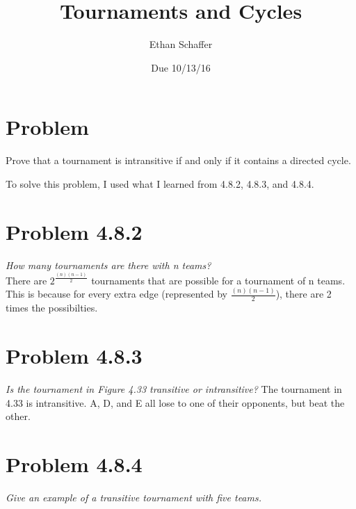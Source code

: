 \documentclass[11pt]{article} %
\title{Tournaments and Cycles}
\author{Ethan Schaffer}
\date{Due 10/13/16}
\newcommand\tab[1][1cm]{\hspace*{#1}}
\begin{document}
\maketitle

\section{Problem}
Prove that a tournament is intransitive if and only if it contains a directed cycle.

To solve this problem, I used what I learned from 4.8.2, 4.8.3, and 4.8.4. 

\section*{Problem 4.8.2}
\textit{How many tournaments are there with n teams?}
\\ \tab There are $2^{\frac{(n)(n-1)}{2}}$ tournaments that are possible for a tournament of n teams. 
This is because for every extra edge (represented by $\frac{(n)(n-1)}{2}$), there are 2 times the possibilties.

\section*{Problem 4.8.3}
\textit{Is the tournament in Figure 4.33 transitive or intransitive?}
The tournament in 4.33 is intransitive. A, D, and E all lose to one of their opponents, but beat the other.

\section*{Problem 4.8.4}
\textit{Give an example of a transitive tournament with five teams.}\\
\end{document}
